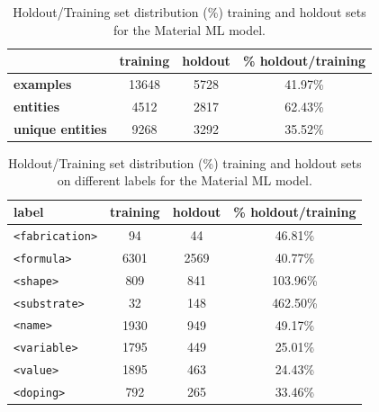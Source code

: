 \begin{table}[htbp]
    \centering
    \caption{Holdout/Training set distribution (\%) training and holdout sets for the Material ML model.}
    \begin{tabular}{lccc}
        \toprule
                                    & \textbf{training} & \textbf{holdout} & \textbf{\% holdout/training} \\
        \midrule
        \textbf{examples}        & 13648             & 5728             & 41.97\%                   \\
        \textbf{entities}        & 4512              & 2817             & 62.43\%                   \\
        \textbf{unique entities} & 9268              & 3292             & 35.52\%                   \\
        \bottomrule
    \end{tabular}
    \label{tab:training-holdout-set-material-distribution-annex}
\end{table}

\begin{table}[htbp]
    \centering
    \caption{Holdout/Training set distribution (\%) training and holdout sets on different labels for the Material ML model.}
    \begin{tabular}{lccc}
        \toprule
        label                  & \textbf{training} & \textbf{holdout} & \textbf{\% holdout/training } \\
        \midrule
        \texttt{<fabrication>} & 94                & 44               & 46.81\%                    \\
        \texttt{<formula>}     & 6301              & 2569             & 40.77\%                    \\
        \texttt{<shape>}       & 809               & 841              & 103.96\%                   \\
        \texttt{<substrate>}   & 32                & 148              & 462.50\%                   \\
        \texttt{<name>}        & 1930              & 949              & 49.17\%                    \\
        \texttt{<variable>}    & 1795              & 449              & 25.01\%                    \\
        \texttt{<value>}       & 1895              & 463              & 24.43\%                    \\
        \texttt{<doping>}      & 792               & 265              & 33.46\%                    \\
        \bottomrule
    \end{tabular}
    \label{tab:training-holdout-labels-material-distribution-annex}
\end{table}


